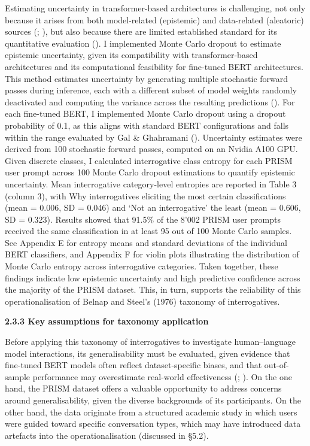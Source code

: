 \documentclass[
  12pt,
]{article}
\begin{document}
Estimating uncertainty in transformer-based architectures is challenging, not only because it arises from both model-related (epistemic) and data-related (aleatoric) sources (; ), but also because there are limited established standard for its quantitative evaluation (). I implemented Monte Carlo dropout to estimate epistemic uncertainty, given its compatibility with transformer-based architectures and its computational feasibility for fine-tuned BERT architectures. This method estimates uncertainty by generating multiple stochastic forward passes during inference, each with a different subset of model weights randomly deactivated and computing the variance across the resulting predictions (). For each fine-tuned BERT, I implemented Monte Carlo dropout using a dropout probability of 0.1, as this aligns with standard BERT configurations and falls within the range evaluated by Gal \& Ghahramani (). Uncertainty estimates were derived from 100 stochastic forward passes, computed on an Nvidia A100 GPU. Given discrete classes, I calculated interrogative class entropy for each PRISM user prompt across 100 Monte Carlo dropout estimations to quantify epistemic uncertainty. Mean interrogative category-level entropies are reported in Table 3 (column 3), with Why interrogatives eliciting the most certain classifications (mean = 0.006, SD = 0.046) and `Not an interrogative' the least (mean = 0.606, SD = 0.323). Results showed that 91.5\% of the 8'002 PRISM user prompts received the same classification in at least 95 out of 100 Monte Carlo samples. See Appendix E for entropy means and standard deviations of the individual BERT classifiers, and Appendix F for violin plots illustrating the distribution of Monte Carlo entropy across interrogative categories. Taken together, these findings indicate low epistemic uncertainty and high predictive confidence across the majority of the PRISM dataset. This, in turn, supports the reliability of this operationalisation of Belnap and Steel's (1976) taxonomy of interrogatives.

\textbf{2.3.3 Key assumptions for taxonomy application}

Before applying this taxonomy of interrogatives to investigate human--language model interactions, its generalisability must be evaluated, given evidence that fine-tuned BERT models often reflect dataset-specific biases, and that out-of-sample performance may overestimate real-world effectiveness (; ). On the one hand, the PRISM dataset offers a valuable opportunity to address concerns around generalisability, given the diverse backgrounds of its participants. On the other hand, the data originate from a structured academic study in which users were guided toward specific conversation types, which may have introduced data artefacts into the operationalisation (discussed in §5.2).
\end{document}
